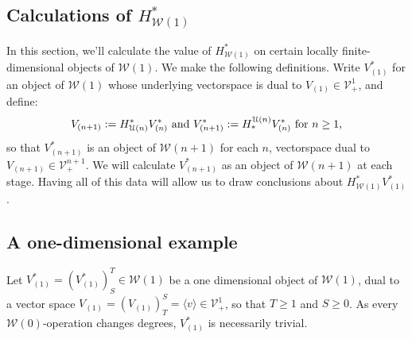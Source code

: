 \documentclass[11pt]{amsart}
\theoremstyle{plain}
\theoremstyle{definition}
\newcommand{\calW}{\mathcal{W}}
\newcommand{\calU}{\mathcal{U}}
\newcommand{\calV}{\mathcal{V}}
\theoremstyle{plain}
\newcommand{\vect}[2]{\calV^{#1}_{#2}}
\begin{document}
\begin{Calculations of HWn for n nonzero}
\section{Calculations of $H^*_{\calW(1)}$}
In this section, we'll calculate the value of $H^*_{\calW(1)}$ on certain locally finite-dimensional objects of $\calW(1)$. We make the following definitions. Write $V^*_{(1)}$ for an object of $\calW(1)$ whose underlying vectorspace is dual to $V_{{(1)}}\in\vect{1}{+}$, and define:
\[V_{(n+1)}:=H^*_{\calU(n)}V^*_{(n)}\textup{ and }V^*_{(n+1)}:=H_*^{\calU(n)}V^*_{(n)}\textup{ for $n\geq1$},\]
so that $V^*_{(n+1)}$ is an object of $\calW(n+1)$ for each $n$, vectorspace dual to $V_{(n+1)}\in\vect{n+1}{+}$.
We will calculate $V^*_{(n+1)}$ as an object of $\calW(n+1)$ at each stage. Having all of this data will allow us to draw conclusions about $H^*_{\calW(1)}V^*_{(1)}$.



\subsection{A one-dimensional example}
Let $V^*_{(1)}=(V_{(1)}^*)^T_S\in\calW(1)$ be a one dimensional object of $\calW(1)$, dual to a vector space $V_{(1)}=(V_{(1)})^S_T=\langle v\rangle\in\vect{1}{+}$, so that $T\geq1$ and $S\geq0$. As every $\calW(0)$-operation changes degrees, $V_{(1)}^*$ is necessarily trivial.


\end{Calculations of HWn for n nonzero}
\end{document}
